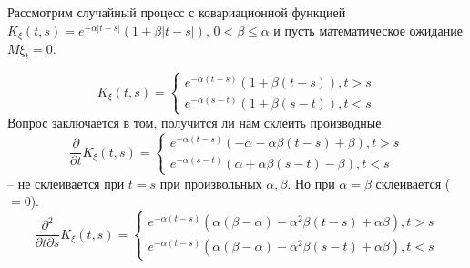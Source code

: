 \begin{ex}
  Рассмотрим случайный процесс с ковариационной функцией
  $K_\xi(t,s) = e^{-\alpha |t-s|} ( 1 + \beta|t-s| ) $, $ 0 < \beta \leqslant \alpha$
  и пусть математическое ожидание $M\xi_t = 0$.

  \[
    K_\xi(t,s) = \begin{cases}
      e^{-\alpha (t-s)} (1+\beta(t-s)), t > s \\
      e^{-\alpha (s - t)} (1+\beta(s-t)), t < s
    \end{cases}
  \]
  Вопрос заключается в том, получится ли нам склеить производные.
  \[
    \dfrac{\partial }{\partial t} K_\xi(t,s) = \begin{cases}
      e^{-\alpha (t-s)} ( - \alpha - \alpha \beta(t-s) + \beta), t > s \\
      e^{-\alpha (s - t)} (\alpha + \alpha \beta (s-t) - \beta), t < s
    \end{cases}
  \]
  -- не склеивается при $t = s$ при произвольных $\alpha, \beta$. Но при $\alpha = \beta$
  склеивается ($=0$).
  \[
    \dfrac{\partial^2 }{\partial t \partial s} K_\xi(t,s) = \begin{cases}
      e^{-\alpha (t-s)} (\alpha(\beta-\alpha)- \alpha^2 \beta(t-s) + \alpha\beta), t > s \\
      e^{-\alpha (t-s)} (\alpha(\beta-\alpha)- \alpha^2 \beta(s-t) + \alpha\beta), t < s
    \end{cases}
  \]
\end{ex}
